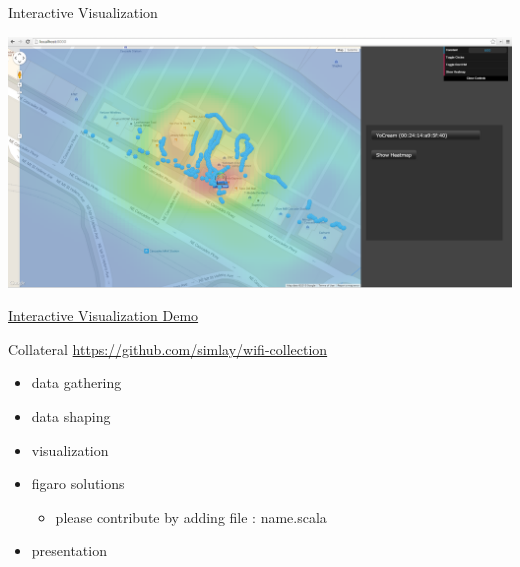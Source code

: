 \documentclass[11pt]{beamer}
\begin{document}
\begin{frame}{Interactive Visualization}

\includegraphics[height=0.55\textheight]{pictures/screenshot4.png}

\href{http://localhost:8000/}{Interactive Visualization Demo}

\end{frame}

\begin{frame}{Collateral}
\href{https://github.com/simlay/wifi-collection}{https://github.com/simlay/wifi-collection}
\begin{itemize}
\item data gathering
\item data shaping
\item visualization
\item figaro solutions
\begin{itemize}
\item please contribute by adding file : name.scala
\end{itemize}
\item presentation
\end{itemize}

\end{frame}
\end{document}
